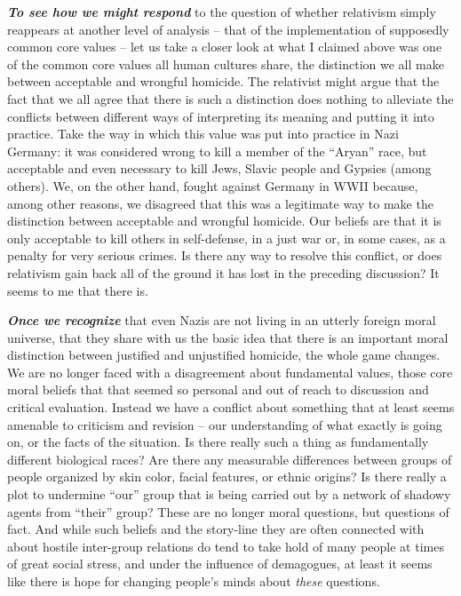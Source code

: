 \documentclass[12pt, openany]{book}
\begin{document}
\textbf{\emph{To see how we might respond}} to the question of whether relativism simply reappears at another level of analysis -- that of the implementation of supposedly common core values -- let us take a closer look at what I claimed above was one of the common core values all human cultures share, the distinction we all make between acceptable and wrongful homicide. The relativist might argue that the fact that we all agree that there is such a distinction does nothing to alleviate the conflicts between different ways of interpreting its meaning and putting it into practice. Take the way in which this value was put into practice in Nazi Germany: it was considered wrong to kill a member of the ``Aryan'' race, but acceptable and even necessary to kill Jews, Slavic people and Gypsies (among others). We, on the other hand, fought against Germany in WWII because, among other reasons, we disagreed that this was a legitimate way to make the distinction between acceptable and wrongful homicide. Our beliefs are that it is only acceptable to kill others in self-defense, in a just war or, in some cases, as a penalty for very serious crimes. Is there any way to resolve this conflict, or does relativism gain back all of the ground it has lost in the preceding discussion? It seems to me that there is.

\textbf{\emph{Once we recognize}} that even Nazis are not living in an utterly foreign moral universe, that they share with us the basic idea that there is an important moral distinction between justified and unjustified homicide, the whole game changes. We are no longer faced with a disagreement about fundamental values, those core moral beliefs that that seemed so personal and out of reach to discussion and critical evaluation. Instead we have a conflict about something that at least seems amenable to criticism and revision -- our understanding of what exactly is going on, or the facts of the situation. Is there really such a thing as fundamentally different biological races? Are there any measurable differences between groups of people organized by skin color, facial features, or ethnic origins? Is there really a plot to undermine ``our'' group that is being carried out by a network of shadowy agents from ``their'' group? These are no longer moral questions, but questions of fact. And while such beliefs and the story-line they are often connected with about hostile inter-group relations do tend to take hold of many people at times of great social stress, and under the influence of demagogues, at least it seems like there is hope for changing people's minds about \emph{these} questions.
\end{document}
